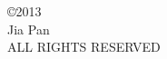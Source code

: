 \begin{center}
\begin{singlespace}
\copyright 2013\\
Jia Pan \\
ALL RIGHTS RESERVED
\end{singlespace}
\end{center}
